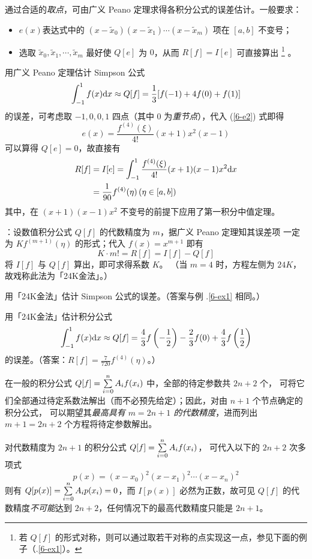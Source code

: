 \entry 通过合适的\emph{取点}，可由广义 Peano 定理求得各积分公式的误差估计。一般要求：
\begin{itemize}\tl
    \item $e(x)$表达式中的 $(x-\tilde{x}_0)(x-\tilde{x}_1)\cdots(x-\tilde{x}_m)$ 项在 $[a,b]$ 不变号；
    \item 选取 $\tilde{x}_0,\tilde{x}_1,\cdots,\tilde{x}_m$ 最好使 $Q[e]$ 为 $0$，从而 $R[f]=I[e]$ 可直接算出
    \footnote{若 $Q[f]$ 的形式对称，则可以通过取若干对称的点实现这一点，参见下面的例子（.\ref{6-ex1}）。}
    。
\end{itemize}

\example\label{6-ex1} 用广义 Peano 定理估计 Simpson 公式
\[ \int_{-1}^1f(x)\mathrm{d} x\approx Q[f]=\frac13[f(-1)+4f(0)+f(1)] \]
的误差，可考虑取 $-1,0,0,1$ 四点（其中 $0$ 为\emph{重节点}），代入 (\ref{6-e2}) 式即得
\[ e(x)=\frac{f^{(4)}(\xi)}{4!}(x+1)x^2(x-1) \]
可以算得 $Q[e]=0$，故直接有
\[\begin{aligned}
    R[f]&=I[e]=\int_{-1}^1\frac{f^{(4)}(\xi)}{4!}(x+1)(x-1)x^2\mathrm{d} x\\
    &=\frac1{90}f^{(4)}(\eta)\,(\eta\in[a,b]) 
\end{aligned}\]
其中，在 $(x+1)(x-1)x^2$ 不变号的前提下应用了第一积分中值定理。

\entry {}：设数值积分公式 $Q[f]$ 的代数精度为 $m$，据广义 Peano 定理知其误差项
一定为 $Kf^{(m+1)}(\eta)$ 的形式；代入 $f(x)=x^{m+1}$ 即有
\[ K\cdot m! = R[f] = I[f] - Q[f] \]
将 $I[f]$ 与 $Q[f]$ 算出，即可求得系数 $K$。
（当 $m=4$ 时，方程左侧为 $24K$，故戏称此法为「24K金法」。）

\example 用「24K金法」估计 Simpson 公式的误差。（答案与例 .\ref{6-ex1} 相同。）

\example 用「24K金法」估计积分公式
\[ \int_{-1}^1f(x)\mathrm{d} x\approx Q[f]=\frac43f\left(-\frac12\right)-\frac23f(0)+
\frac43f\left(\frac12\right) \]
的误差。（答案：$R[f]=\frac7{720}f^{(4)}(\eta)$。）

\entry 在一般的积分公式 $Q[f]=\sum\limits_{i=0}^nA_if(x_i)$ 中，全部的待定参数共 $2n+2$ 个，
可将它们全部通过待定系数法解出（而不必预先给定）；因此，对由 $n+1$ 个节点确定的积分公式，
可以期望其\emph{最高具有 $m=2n+1$ 的代数精度}，进而列出 $m+1=2n+2$ 个方程将待定参数解出。

\entry 对代数精度为 $2n+1$ 的积分公式 $Q[f]=\sum\limits_{i=0}^nA_if(x_i)$，
可代入以下的 $2n+2$ 次多项式
\[ p(x)=(x-x_0)^2(x-x_1)^2\cdots(x-x_n)^2 \]
则有 $Q[p(x)]=\sum\limits_{i=0}^nA_ip(x_i)=0$，而 $I[p(x)]$ 必然为正数，故可见 $Q[f]$ 的代数精度\emph{不可能}达到 $2n+2$，任何情况下的最高代数精度只能是 $2n+1$。

